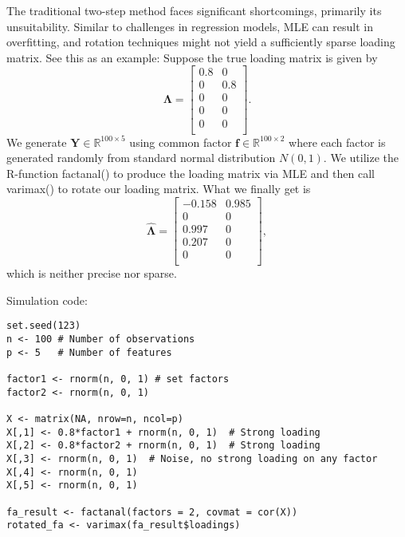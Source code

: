 \documentclass[
  a4paper,
  oneside,
  openany,
  12pt,
  onecolumn]{book}
\theoremstyle{plain}
\theoremstyle{remark}
\begin{document}
The traditional two-step method faces significant shortcomings,
primarily its unsuitability\citep{hiroseSparseEstimationNonconcave2015}.
Similar to challenges in regression models, MLE can result in
overfitting, and rotation techniques might not yield a sufficiently
sparse loading matrix. See this as an example: Suppose the true loading
matrix is given by \[
\boldsymbol{\Lambda}=
\begin{bmatrix}
0.8 & 0 \\
0 & 0.8 \\
0 & 0\\
0 & 0\\
0 & 0\\
\end{bmatrix}.
\] We generate \(\boldsymbol{Y}\in \mathbb{R}^{{100}\times 5}\) using
common factor \(\boldsymbol{f}\in \mathbb{R}^{{100}\times 2}\) where
each factor is generated randomly from standard normal distribution
\(N(0,1)\). We utilize the R-function factanal() to produce the loading
matrix via MLE and then call varimax() to rotate our loading matrix.
What we finally get is \[
\hat{\boldsymbol{\Lambda}}=
\begin{bmatrix}
-0.158 & 0.985\\
0 & 0\\
0.997 & 0\\
0.207 & 0\\
0 & 0\\
\end{bmatrix},
\] which is neither precise nor sparse.

Simulation code:

\begin{verbatim}
set.seed(123)
n <- 100 # Number of observations
p <- 5   # Number of features

factor1 <- rnorm(n, 0, 1) # set factors
factor2 <- rnorm(n, 0, 1)

X <- matrix(NA, nrow=n, ncol=p)
X[,1] <- 0.8*factor1 + rnorm(n, 0, 1)  # Strong loading
X[,2] <- 0.8*factor2 + rnorm(n, 0, 1)  # Strong loading
X[,3] <- rnorm(n, 0, 1)  # Noise, no strong loading on any factor
X[,4] <- rnorm(n, 0, 1)  
X[,5] <- rnorm(n, 0, 1) 

fa_result <- factanal(factors = 2, covmat = cor(X))
rotated_fa <- varimax(fa_result$loadings)
\end{verbatim}
\end{document}
